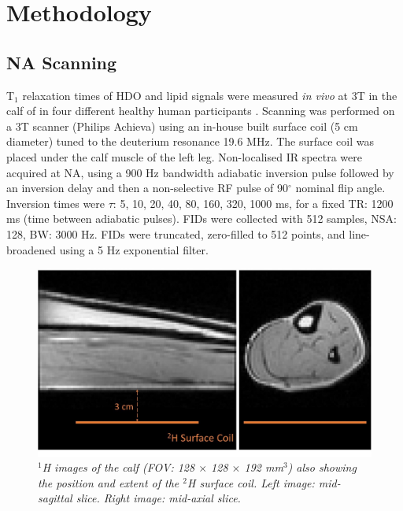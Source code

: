\section{Methodology}

\subsection{\ac{NA} Scanning}

T$_1$ relaxation times of \ac{HDO} and lipid signals were measured \textit{in vivo} at 3T in the calf of in four different healthy human participants \cite{Damion2021NaturalT}. Scanning was performed on a 3T scanner (Philips Achieva) using an in-house built surface coil (5 cm diameter) tuned to the deuterium resonance 19.6 MHz. The surface coil was placed under the calf muscle of the left leg. Non-localised \ac{IR} spectra were acquired at \ac{NA}, using a 900 Hz bandwidth adiabatic inversion pulse followed by an inversion delay and then a non-selective \ac{RF} pulse of 90$^\circ$ nominal flip angle. Inversion times were $\tau$: {5, 10, 20, 40, 80, 160, 320, 1000} ms, for a fixed \ac{TR}: 1200 ms (time between adiabatic pulses). \ac{FID}s were collected with 512 samples, NSA: 128, \ac{BW}: 3000 Hz. FIDs were truncated, zero-filled to 512 points, and line-broadened using a 5 Hz exponential filter. %

\begin{figure}
    \centering
    \includegraphics[width=1\textwidth]{Figures/Lipid/Coil.jpg}
    \caption{\textit{$^1$H images of the calf (\ac{FOV}: 128 $\times$ 128 $\times$ 192 mm$^3$) also showing the position and extent of the $^2$H surface coil. Left image: mid-sagittal slice. Right image: mid-axial slice.}}
    \label{fig:Lip:Coil}
\end{figure}

